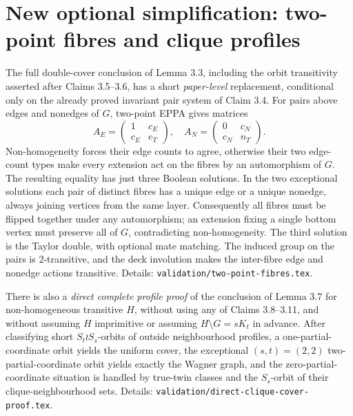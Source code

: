 \documentclass[11pt,a4paper]{article}
\begin{document}
\section*{New optional simplification: two-point fibres and clique profiles}
The full double-cover conclusion of Lemma 3.3, including
the orbit transitivity asserted after Claims 3.5--3.6,
has a short \emph{paper-level} replacement, conditional
only on the already proved invariant pair system of
Claim 3.4. For pairs above edges and nonedges of \(G\),
two-point EPPA gives matrices
\[
 A_E=\begin{pmatrix}1&c_E\\c_E&e_T\end{pmatrix},
 \quad
 A_N=\begin{pmatrix}0&c_N\\c_N&n_T\end{pmatrix}.
\]
Non-homogeneity forces their edge counts to agree,
otherwise their two edge-count types make every
extension act on the fibres by an automorphism of \(G\).
The resulting equality has just three Boolean solutions.
In the two exceptional solutions each pair of distinct
fibres has a unique edge or a unique nonedge, always
joining vertices from the same layer. Consequently all
fibres must be flipped together under any automorphism;
an extension fixing a single bottom vertex must preserve
all of \(G\), contradicting non-homogeneity.
The third solution is the Taylor double, with optional
mate matching. The induced group on the pairs is
2-transitive, and the deck involution makes the
inter-fibre edge and nonedge actions transitive.
Details: \texttt{validation/two-point-fibres.tex}.

There is also a \emph{direct complete profile proof}
of the conclusion of Lemma 3.7 for non-homogeneous
transitive \(H\), without using any of Claims
3.8--3.11, and without assuming \(H\) imprimitive
or assuming \(H\setminus G=sK_t\) in advance.
After classifying short \(S_t\wr S_s\)-orbits of
outside neighbourhood profiles, a one-partial-
coordinate orbit yields the uniform cover,
the exceptional \((s,t)=(2,2)\) two-partial-coordinate
orbit yields exactly the Wagner graph, and the
zero-partial-coordinate situation is handled by
true-twin classes and the \(S_s\)-orbit of their
clique-neighbourhood sets.
Details: \texttt{validation/direct-clique-cover-proof.tex}.
\end{document}
